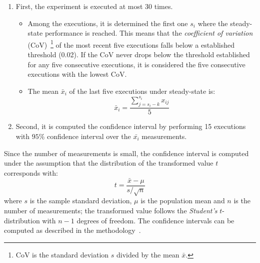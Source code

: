\begin{enumerate}
\item First, the experiment is executed at most 30 times.
  \begin{itemize}
  \item Among the executions, it is determined the first one \(s_i\) where the steady-state performance is reached. This means that the \textit{coefficient of variation} (CoV)~\footnote{CoV is the standard deviation \(s\) divided by the mean \(\bar{x}\).} of the most recent five {executions} falls below a established threshold (0.02). If the CoV never drops below the threshold established for any five consecutive {executions}, it is considered the five consecutive {executions} with the lowest CoV.
  \item The mean \(\bar{x}_i\) of the last five {executions} under steady-state is:
    \begin{equation*}
      \bar{x}_i = \frac{\sum^{s_i}_{j=s_i - k}x_{ij}}{5}
    \end{equation*}
  \end{itemize}
\item Second, it is computed the confidence interval by performing 15 {executions} with \(95\%\) confidence interval over the \(\bar{x_i}\) measurements.

\end{enumerate}

Since the number of measurements is small, the confidence interval is computed under the assumption that the distribution of the transformed value \(t\) corresponds with:
\begin{equation*}
  t = \frac{\bar{x} - \mu}{s/\sqrt{n}}
\end{equation*}
where \(s\) is the sample standard deviation, \(\mu\) is the population mean and \(n\) is the number of measurements; the transformed value follows the \textit{Student's} \(t\)-distribution with \(n - 1\) degrees of freedom. The confidence intervals can be computed as described in the methodology~\cite{DBLP_conf_oopsla_GeorgesBE07}.


